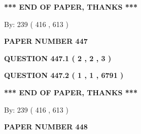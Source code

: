 \documentclass[12pt]{article}
\begin{document}
  
   
   
 \vspace{0.2in}
 
   
   
   
   
\vspace{1.0in} 
{\textbf{\large{ *** END OF PAPER, THANKS *** }}} 
   
   
\hspace{1.0in} By: 
 239 ( 416 ,  613 )
   
   
   
   
\newpage 
\setcounter{page}{ 
   447001 } 
   
   
   
   
 {\textbf{ \Large{ PAPER NUMBER  447  }}}
   
   
\vspace{0.2in}
   
   
   
   
   
   
 \vspace{0.2in}
 
 
 
 
   
   
  
\vspace{0.2in}
  
{\textbf{\Large{QUESTION
447.1 
 ( 2 , 2 , 3 )
}}}
  
  
  
\vspace{0.2in}
  
{\textbf{\Large{QUESTION
447.2 
 ( 1 , 1 , 6791 )
}}}
  
  
   
   
 \vspace{0.2in}
 
   
   
   
   
\vspace{1.0in} 
{\textbf{\large{ *** END OF PAPER, THANKS *** }}} 
   
   
\hspace{1.0in} By: 
 239 ( 416 ,  613 )
   
   
   
   
\newpage 
\setcounter{page}{ 
   448001 } 
   
   
   
   
 {\textbf{ \Large{ PAPER NUMBER  448  }}}
   
\end{document}
